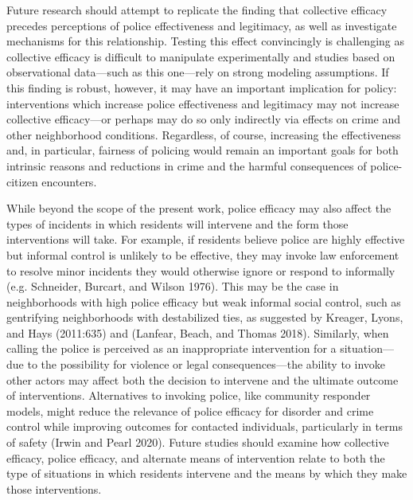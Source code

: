 \documentclass [11pt, proquest] {uwthesis}[2015/03/03]
\begin{document}
Future research should attempt to replicate the finding that collective efficacy precedes perceptions of police effectiveness and legitimacy, as well as investigate mechanisms for this relationship. Testing this effect convincingly is challenging as collective efficacy is difficult to manipulate experimentally and studies based on observational data---such as this one---rely on strong modeling assumptions. If this finding is robust, however, it may have an important implication for policy: interventions which increase police effectiveness and legitimacy may not increase collective efficacy---or perhaps may do so only indirectly via effects on crime and other neighborhood conditions. Regardless, of course, increasing the effectiveness and, in particular, fairness of policing would remain an important goals for both intrinsic reasons and reductions in crime and the harmful consequences of police-citizen encounters.

While beyond the scope of the present work, police efficacy may also affect the types of incidents in which residents will intervene and the form those interventions will take. For example, if residents believe police are highly effective but informal control is unlikely to be effective, they may invoke law enforcement to resolve minor incidents they would otherwise ignore or respond to informally (e.g. Schneider, Burcart, and Wilson 1976). This may be the case in neighborhoods with high police efficacy but weak informal social control, such as gentrifying neighborhoods with destabilized ties, as suggested by Kreager, Lyons, and Hays (2011:635) and (Lanfear, Beach, and Thomas 2018). Similarly, when calling the police is perceived as an inappropriate intervention for a situation---due to the possibility for violence or legal consequences---the ability to invoke other actors may affect both the decision to intervene and the ultimate outcome of interventions. Alternatives to invoking police, like community responder models, might reduce the relevance of police efficacy for disorder and crime control while improving outcomes for contacted individuals, particularly in terms of safety (Irwin and Pearl 2020). Future studies should examine how collective efficacy, police efficacy, and alternate means of intervention relate to both the type of situations in which residents intervene and the means by which they make those interventions.
\end{document}
